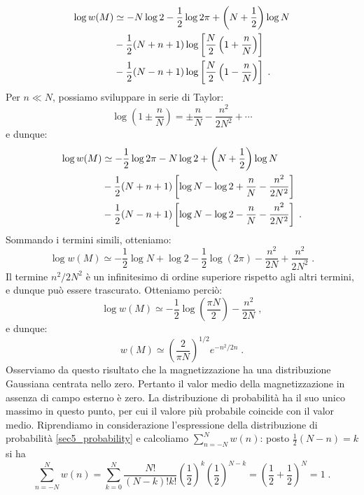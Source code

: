 \begin{align}
 \log w(M)&\simeq -N\log 2-\frac{1}{2}\log 2\pi+\left(N+\frac{1}{2}\right)\log N \notag \\
 &- \frac{1}{2}(N+n+1)\log\left[\frac{N}{2}\left(1+\frac{n}{N}\right)\right] \notag \\
 &- \frac{1}{2}(N-n+1)\log\left[\frac{N}{2}\left(1-\frac{n}{N}\right)\right]\;.
\end{align}
Per $n\ll N$, possiamo sviluppare in serie di Taylor:
\begin{equation}
 \log\left(1\pm\frac{n}{N}\right)=\pm\frac{n}{N}-\frac{n^2}{2N^2}+\cdots
\end{equation}
e dunque:
\begin{align}
 \log w(M) &\simeq -\frac{1}{2}\log 2\pi-N\log 2+\left(N+\frac{1}{2}\right)\log N \\
 &-\frac{1}{2}(N+n+1)\left[\log N-\log 2+\frac{n}{N}-\frac{n^2}{2N^2}\right] \notag \\
 &-\frac{1}{2}(N-n+1)\left[\log N-\log 2-\frac{n}{N}-\frac{n^2}{2N^2}\right]\;. \\
\end{align}
Sommando i termini simili, otteniamo:
\begin{equation}
\log w(M)\simeq -\frac{1}{2}\log N+\log 2-\frac{1}{2}\log(2\pi)-\frac{n^2}{2N}+\frac{n^2}{2N^2}\;.
\end{equation}
Il termine $n^2/2N^2$ è un infinitesimo di ordine superiore rispetto agli altri termini, e dunque può essere trascurato. Otteniamo perciò:
\begin{equation}
 \log w(M) \simeq -\frac{1}{2}\log\left(\frac{\pi N}{2}\right)-\frac{n^2}{2N}\;,
\end{equation}
e dunque:
\begin{equation}
 w(M)\simeq \left(\frac{2}{\pi N}\right)^{1/2}e^{-n^2/2n}\;.
\end{equation}
Osserviamo da questo risultato che la magnetizzazione ha una distribuzione Gaussiana centrata nello zero. Pertanto il valor medio 
della magnetizzazione in assenza di campo esterno è zero. La distribuzione di probabilità ha il suo unico  massimo in questo punto, per 
cui il valore più probabile coincide con il valor medio. Riprendiamo in considerazione l'espressione della distribuzione di probabilità \eqref{sec5_probability} e calcoliamo $\sum_{n=-N}^N w(n)$: posto $\frac{1}{2}(N-n)=k$ si ha
\begin{equation}
\sum_{n=-N}^N w(n)=\sum_{k=0}^N \frac{N!}{(N-k)!k!}\left(\frac{1}{2}\right)^k\left(\frac{1}{2}\right)^{N-k}= \left(\frac{1}{2}+\frac{1}{2}\right)^N=1\;.
\end{equation}
